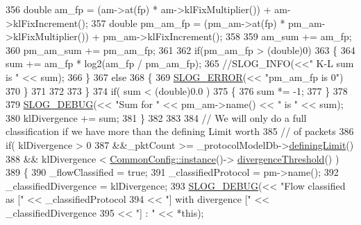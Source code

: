 \begin{DoxyCode}
356                     \textcolor{keywordtype}{double} am\_fp = (am->at(fp) * am->klFixMultiplier()) + am->klFixIncrement();
357                     \textcolor{keywordtype}{double} pm\_am\_fp = (pm\_am->at(fp) * pm\_am->klFixMultiplier()) + pm\_am->klFixIncrement();
358 
359                     am\_sum += am\_fp;
360                     pm\_am\_sum += pm\_am\_fp;
361 
362                     \textcolor{keywordflow}{if}(pm\_am\_fp > (\textcolor{keywordtype}{double})0)
363                     \{   
364                         sum += am\_fp * log2(am\_fp / pm\_am\_fp);
365                         \textcolor{comment}{//SLOG\_INFO(<<" K-L sum is " << sum);}
366                     \}
367                     \textcolor{keywordflow}{else}
368                     \{
369                         \hyperlink{_logger_8h_a2a8694cd392d18f4db6b9cc9f15bafe3}{SLOG\_ERROR}(<< \textcolor{stringliteral}{"pm\_am\_fp is 0"})
370                     \}
371 
372                     
373                 \}
374                 \textcolor{keywordflow}{if}( sum < (\textcolor{keywordtype}{double})0.0 )
375                 \{
376                     sum *= -1;
377                 \}
378 
379                 \hyperlink{_logger_8h_a1eb7292acb79b8ddab9851b3a9f7a4da}{SLOG\_DEBUG}(<< \textcolor{stringliteral}{"Sum for "} << pm\_am->name() << \textcolor{stringliteral}{" is "} << sum);
380                 klDivergence += sum;
381             \}
382 
383 
384             \textcolor{comment}{// We will only do a full classification if we have more than the defining Limit worth}
385             \textcolor{comment}{// of packets}
386             \textcolor{keywordflow}{if}( klDivergence > 0 
387                     &&\_pktCount >= \_protocolModelDb->\hyperlink{class_vsid_1_1_protocol_model_db_a511e5fdf67995099e81175a6d34d1aac}{definingLimit}() 
388                     && klDivergence < \hyperlink{class_vsid_common_1_1_common_config_a69c29458a786be527fe66470ac9fbbdb}{CommonConfig::instance}()->
      \hyperlink{class_vsid_common_1_1_common_config_ac08bbad3a85c8ba4e43a591f7f02fe06}{divergenceThreshold}() )
389             \{
390                 \_flowClassified = \textcolor{keyword}{true};
391                 \_classifiedProtocol = pm->name();
392                 \_classifiedDivergence = klDivergence;
393                 \hyperlink{_logger_8h_a1eb7292acb79b8ddab9851b3a9f7a4da}{SLOG\_DEBUG}(<< \textcolor{stringliteral}{"Flow classified as ["} << \_classifiedProtocol 
394                             << \textcolor{stringliteral}{"] with divergence ["} << \_classifiedDivergence 
395                             << \textcolor{stringliteral}{"] : "} << *\textcolor{keyword}{this});

\end{DoxyCode}
